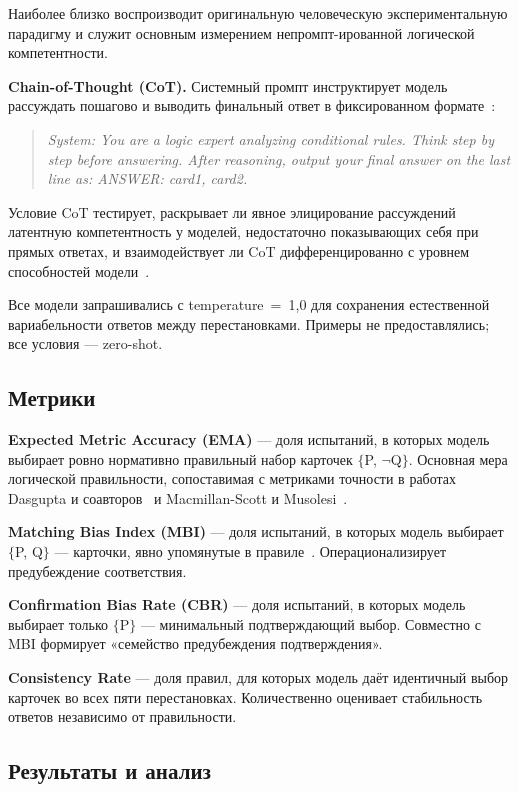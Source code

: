 Наиболее близко воспроизводит оригинальную человеческую экспериментальную парадигму и служит основным измерением непромпт-ированной логической компетентности.

\textbf{Chain-of-Thought (CoT).} Системный промпт инструктирует модель рассуждать пошагово и выводить финальный ответ в фиксированном формате~\cite{wei2022chain}:

\begin{quote}
\textit{System: You are a logic expert analyzing conditional rules. Think step by step before answering. After reasoning, output your final answer on the last line as: ANSWER: card1, card2.}
\end{quote}

Условие CoT тестирует, раскрывает ли явное элицирование рассуждений латентную компетентность у моделей, недостаточно показывающих себя при прямых ответах, и взаимодействует ли CoT дифференцированно с уровнем способностей модели~\cite{kojima2022large}.

Все модели запрашивались с temperature~=~1{,}0 для сохранения естественной вариабельности ответов между перестановками. Примеры не предоставлялись; все условия --- zero-shot.

\subsection{Метрики}

\textbf{Expected Metric Accuracy (EMA)} --- доля испытаний, в которых модель выбирает ровно нормативно правильный набор карточек $\{$P, $\lnot$Q$\}$. Основная мера логической правильности, сопоставимая с метриками точности в работах Dasgupta и соавторов~\cite{dasgupta2024language} и Macmillan-Scott и Musolesi~\cite{macmillan2024irrationality}.

\textbf{Matching Bias Index (MBI)} --- доля испытаний, в которых модель выбирает $\{$P, Q$\}$ --- карточки, явно упомянутые в правиле~\cite{evans1998matching}. Операционализирует предубеждение соответствия.

\textbf{Confirmation Bias Rate (CBR)} --- доля испытаний, в которых модель выбирает только $\{$P$\}$ --- минимальный подтверждающий выбор. Совместно с MBI формирует «семейство предубеждения подтверждения».

\textbf{Consistency Rate} --- доля правил, для которых модель даёт идентичный выбор карточек во всех пяти перестановках. Количественно оценивает стабильность ответов независимо от правильности.

\subsection{Результаты и анализ}


